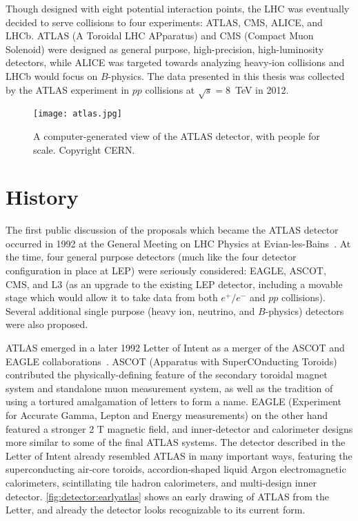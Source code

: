 \label{chapter:detector}

Though designed with eight potential interaction points, the LHC was eventually decided to serve collisions to four experiments: ATLAS, CMS, ALICE, and LHCb. ATLAS (A Toroidal LHC APparatus) and CMS (Compact Muon Solenoid) were designed as general purpose, high-precision, high-luminosity detectors, while ALICE was targeted towards analyzing heavy-ion collisions and LHCb would focus on $B$-physics. The data presented in this thesis was collected by the ATLAS experiment in $pp$ collisions at $\sqrt{s} = 8$~TeV in 2012. 



\begin{figure}
\centering
\texttt{[image: atlas.jpg]}
\label{fig:detector:atlas}
\caption{A computer-generated view of the ATLAS detector, with people for scale. Copyright CERN.}
\end{figure}




\section{History}

The first public discussion of the proposals which became the ATLAS detector occurred in 1992 at the General Meeting on LHC Physics at Evian-les-Bains~\cite{Evian,EvianCourier}. At the time, four general purpose detectors (much like the four detector configuration in place at LEP) were seriously considered: EAGLE, ASCOT, CMS, and L3 (as an upgrade to the existing LEP detector, including a movable stage which would allow it to take data from both $e^+/e^-$ and $pp$ collisions). Several additional single purpose (heavy ion, neutrino, and $B$-physics) detectors were also proposed.

ATLAS emerged in a later 1992 Letter of Intent as a merger of the ASCOT and EAGLE collaborations~\cite{ATLAS-LoI}. ASCOT (Apparatus with SuperCOnducting Toroids) contributed the physically-defining feature of the secondary toroidal magnet system and standalone muon measurement system, as well as the tradition of using a tortured amalgamation of letters to form a name. EAGLE (Experiment for Accurate Gamma, Lepton and Energy measurements) on the other hand featured a stronger 2 T magnetic field, and inner-detector and calorimeter designs more similar to some of the final ATLAS systems. The detector described in the Letter of Intent already resembled ATLAS in many important ways, featuring the superconducting air-core toroids, accordion-shaped liquid Argon electromagnetic calorimeters, scintillating tile hadron calorimeters, and multi-design inner detector. \ref{fig:detector:earlyatlas} shows an early drawing of ATLAS from the Letter, and already the detector looks recognizable to its current form.

